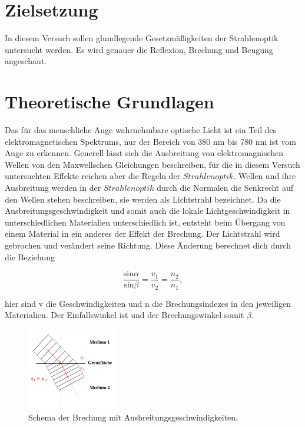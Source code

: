 \section{Zielsetzung}

    \noindent In diesem Versuch sollen glundlegende Gesetzmäßigkeiten der Strahlenoptik untersucht werden.
    Es wird genauer die Reflexion, Brechung und Beugung angeschaut.

\section{Theoretische Grundlagen}

    Das für das menschliche Auge wahrnehmbare optische Licht ist ein Teil des elektromagnetischen Spektrums, nur der Bereich von 380 nm bis 780 
    nm ist vom Auge zu erkennen. Generell lässt sich die Ausbreitung von elektromagnischen Wellen von den Maxwellschen Gleichungen beschreiben, 
    für die in diesem Versuch untersuchten Effekte reichen aber die Regeln der $Strahlenoptik$. Wellen und ihre Ausbreitung werden in der 
    $Strahlenoptik$ durch die Normalen die Senkrecht auf den Wellen stehen beschreiben, sie werden als Lichtstrahl bezeichnet. Da die 
    Ausbreitungsgeschwindigkeit und somit auch die lokale Lichtgeschwindigkeit in unterschiedlichen Materialien unterschiedlich ist, entsteht beim 
    Übergang von einem Material in ein anderes der Effekt der Brechung. Der Lichtstrahl wird gebrochen und verändert seine Richtung. 
    Diese Änderung berechnet dich durch die Beziehung

    \begin{equation}
        \frac{\text{sin}\alpha}{\text{sin} \beta} = \frac{v_1}{v_2} = \frac{n_2}{n_1},
    \end{equation}

    \noindent   hier sind v die Geschwindigkeiten und n die Brechungsindezes in den jeweiligen Materialien. Der Einfallswinkel ist \alpha und der 
    Brechungswinkel somit $\beta$.

    \begin{figure}[H]
        \centering
        \includegraphics[width=0.35\textwidth]{latex/images/T1.PNG}
        \caption{Schema der Brechung mit Ausbreitungsgeschwindigkeiten\protect \cite{V400}.}
    \end{figure}

